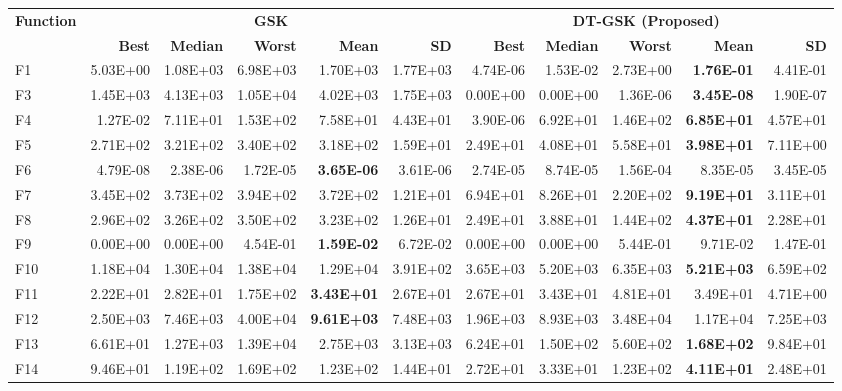 \zebra
\begin{tabular}{lrrrrrrrrrr}
\toprule
\textbf{Function} & \multicolumn{5}{c}{\textbf{GSK}} & \multicolumn{5}{c}{\textbf{DT-GSK (Proposed)}} \\
\cmidrule(lr){2-6} \cmidrule(lr){7-11}
 & \textbf{Best} & \textbf{Median} & \textbf{Worst} & \textbf{Mean} & \textbf{SD} & \textbf{Best} & \textbf{Median} & \textbf{Worst} & \textbf{Mean} & \textbf{SD} \\
\midrule
F1 & 5.03E+00 & 1.08E+03 & 6.98E+03 & 1.70E+03 & 1.77E+03 & 4.74E-06 & 1.53E-02 & 2.73E+00 & \textbf{1.76E-01} & 4.41E-01 \\
F3 & 1.45E+03 & 4.13E+03 & 1.05E+04 & 4.02E+03 & 1.75E+03 & 0.00E+00 & 0.00E+00 & 1.36E-06 & \textbf{3.45E-08} & 1.90E-07 \\
F4 & 1.27E-02 & 7.11E+01 & 1.53E+02 & 7.58E+01 & 4.43E+01 & 3.90E-06 & 6.92E+01 & 1.46E+02 & \textbf{6.85E+01} & 4.57E+01 \\
F5 & 2.71E+02 & 3.21E+02 & 3.40E+02 & 3.18E+02 & 1.59E+01 & 2.49E+01 & 4.08E+01 & 5.58E+01 & \textbf{3.98E+01} & 7.11E+00 \\
F6 & 4.79E-08 & 2.38E-06 & 1.72E-05 & \textbf{3.65E-06} & 3.61E-06 & 2.74E-05 & 8.74E-05 & 1.56E-04 & 8.35E-05 & 3.45E-05 \\
F7 & 3.45E+02 & 3.73E+02 & 3.94E+02 & 3.72E+02 & 1.21E+01 & 6.94E+01 & 8.26E+01 & 2.20E+02 & \textbf{9.19E+01} & 3.11E+01 \\
F8 & 2.96E+02 & 3.26E+02 & 3.50E+02 & 3.23E+02 & 1.26E+01 & 2.49E+01 & 3.88E+01 & 1.44E+02 & \textbf{4.37E+01} & 2.28E+01 \\
F9 & 0.00E+00 & 0.00E+00 & 4.54E-01 & \textbf{1.59E-02} & 6.72E-02 & 0.00E+00 & 0.00E+00 & 5.44E-01 & 9.71E-02 & 1.47E-01 \\
F10 & 1.18E+04 & 1.30E+04 & 1.38E+04 & 1.29E+04 & 3.91E+02 & 3.65E+03 & 5.20E+03 & 6.35E+03 & \textbf{5.21E+03} & 6.59E+02 \\
F11 & 2.22E+01 & 2.82E+01 & 1.75E+02 & \textbf{3.43E+01} & 2.67E+01 & 2.67E+01 & 3.43E+01 & 4.81E+01 & 3.49E+01 & 4.71E+00 \\
F12 & 2.50E+03 & 7.46E+03 & 4.00E+04 & \textbf{9.61E+03} & 7.48E+03 & 1.96E+03 & 8.93E+03 & 3.48E+04 & 1.17E+04 & 7.25E+03 \\
F13 & 6.61E+01 & 1.27E+03 & 1.39E+04 & 2.75E+03 & 3.13E+03 & 6.24E+01 & 1.50E+02 & 5.60E+02 & \textbf{1.68E+02} & 9.84E+01 \\
F14 & 9.46E+01 & 1.19E+02 & 1.69E+02 & 1.23E+02 & 1.44E+01 & 2.72E+01 & 3.33E+01 & 1.23E+02 & \textbf{4.11E+01} & 2.48E+01 \\

\end{tabular}
